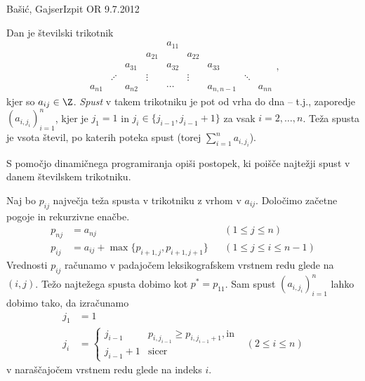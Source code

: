 \begin{naloga}{Bašić, Gajser}{Izpit OR 9.7.2012}
\begin{vprasanje}
Dan je številski trikotnik
$$
\begin{array}{ccccccccc}
                &&&& a_{11} \\
            &&& a_{21} && a_{22} \\
        && a_{31} && a_{32} && a_{33} \\
     & \iddots && \vdots && \vdots && \ddots \\
a_{n1} && a_{n2} && \cdots && a_{n,n-1} && a_{nn}
\end{array} ,
$$
kjer so $a_{ij} \in \Z$.
{\em Spust} v takem trikotniku je pot od vrha do dna
-- t.j., zaporedje $(a_{i, j_i})_{i=1}^n$,
kjer je $j_1 = 1$ in $j_i \in \{j_{i-1}, j_{i-1}+1\}$
za vsak $i = 2, \dots, n$.
Teža spusta je vsota števil, po katerih poteka spust
(torej $\sum_{i=1}^n a_{i, j_i}$).

S pomočjo dinamičnega programiranja opiši postopek,
ki poišče najtežji spust v danem številskem trikotniku.
\end{vprasanje}

\begin{odgovor}
Naj bo $p_{ij}$ največja teža spusta v trikotniku z vrhom v $a_{ij}$.
Določimo začetne pogoje in rekurzivne enačbe.
\begin{align*}
p_{nj} &= a_{nj} && (1 \le j \le n) \\
p_{ij} &= a_{ij} + \max\{p_{i+1,j}, p_{i+1,j+1}\} && (1 \le j \le i \le n-1)
\end{align*}
Vrednosti $p_{ij}$ računamo
v padajočem leksikografskem vrstnem redu glede na $(i, j)$.
Težo najtežega spusta dobimo kot $p^* = p_{11}$.
Sam spust $(a_{i, j_i})_{i=1}^n$ lahko dobimo tako,
da izračunamo
\begin{align*}
j_1 &= 1 \\
j_i &= \begin{cases}
j_{i-1} & p_{i,j_{i-1}} \ge p_{i,j_{i-1}+1}, \text{in} \\
j_{i-1} + 1 & \text{sicer}
\end{cases}
& (2 \le i \le n)
\end{align*}
v naraščajočem vrstnem redu glede na indeks $i$.
\end{odgovor}
\end{naloga}
